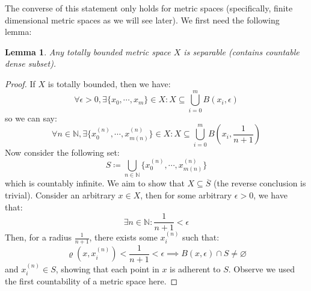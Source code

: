 \documentclass[10pt,letterpaper]{article} %
\newtheorem{lem}{Lemma}[section]
\begin{document}
The converse of this statement only holds for metric spaces (specifically, finite dimensional metric spaces as we will see later). We first need the following lemma:
\begin{lem}
Any totally bounded metric space $X$ is separable (contains countable dense subset). 
\end{lem}
\begin{proof}
If $X$ is totally bounded, then we have:
\begin{equation*}
\forall \epsilon > 0, \exists \{x_0, \cdots, x_m\} \in X: X \subseteq \bigcup_{i = 0}^{m}B(x_i, \epsilon)
\end{equation*}
so we can say:
\begin{equation*}
\forall n \in \mathbb{N}, \exists \{x_0^{(n)}, \cdots, x_{m(n)}^{(n)}\} \in X: X \subseteq \bigcup_{i = 0}^{m}B\left(x_i, \frac{1}{n+1}\right)
\end{equation*}
Now consider the following set:
\begin{equation*}
S \coloneq \bigcup_{n \in \mathbb{N}}\{x_0^{(n)}, \cdots, x_{m(n)}^{(n)}\}
\end{equation*}
which is countably infinite. We aim to show that $X \subseteq \overline{S}$ (the reverse conclusion is trivial). Consider an arbitrary $x \in X$, then for some arbitrary $\epsilon > 0$, we have that:
\begin{equation*}
\exists n \in \mathbb{N}: \frac{1}{n+1} < \epsilon
\end{equation*}
Then, for a radius $\frac{1}{n+1}$, there exists some $x_i^{(n)}$ such that:
\begin{equation*}
\varrho(x, x_i^{(n)}) < \frac{1}{n+1} < \epsilon \implies B(x, \epsilon) \cap S \neq \varnothing
\end{equation*}
and $x_i^{(n)} \in S$, showing that each point in $x$ is adherent to $S$. Observe we used the first countability of a metric space here.
\end{proof}
\end{document}
